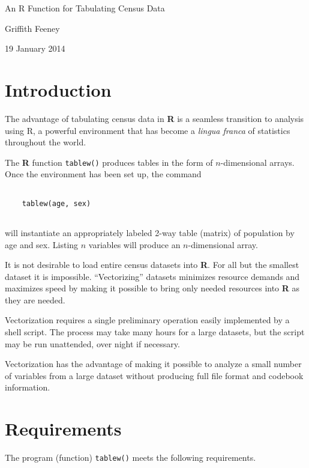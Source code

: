 


\centerline{\LARGE An R Function for Tabulating Census Data}
\vspace{8pt}
\centerline{\large Griffith Feeney}
\vspace{6pt}
\centerline{\large 19 January 2014}

\vspace{10pt}

\section{Introduction}\label{introduction}

The advantage of tabulating census data in {\bf R} is a seamless transition to analysis using R, a powerful environment that has become a {\it lingua franca} of statistics throughout the world.

The {\bf R} function {\tt tablew()} produces tables in the form of $n$-dimensional arrays. Once the environment has been set up, the command

\begin{verbatim}

    tablew(age, sex)
	
\end{verbatim}

will instantiate an appropriately labeled 2-way table (matrix) of population by age and sex. Listing $n$ variables will produce an $n$-dimensional array.

It is not desirable to load entire census datasets into {\bf R}. For all but the smallest dataset it is impossible. ``Vectorizing'' datasets minimizes resource demands and maximizes speed by making it possible to bring only needed resources into {\bf R} as they are needed.

Vectorization requires a single preliminary operation easily implemented by a shell script. The process may take many hours for a large datasets, but the script may be run unattended, over night if necessary.

Vectorization has the advantage of making it possible to analyze a small number of variables from a large dataset without producing full file format and codebook information.


\section{Requirements}

The program (function) {\tt tablew()} meets the following requirements.

